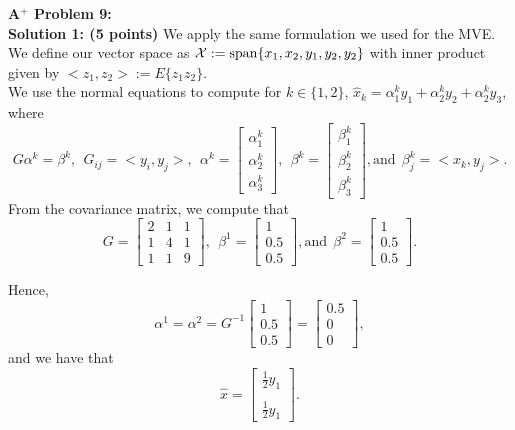 \documentclass[letterpaper]{article}
\begin{document}
\newpage
\noindent \textbf{A$^+$ Problem 9:} \\



 \noindent \textbf{Solution 1: (5 points)} We apply the same formulation we used for the MVE. We define our vector space as ${\cal X} := \textrm{span} \{ x_1, x_2, y_1, y_2, y_2 \}$ with inner product given by $<z_1, z_2>:=E\{ z_1 z_2 \}$. \\

 We use the normal equations to compute for $k \in \{1,2\}$, $\widehat{x}_k = \alpha_1^k y_1+ \alpha_2^k y_2 + \alpha_2^k y_3$, where
 $$ G \alpha^k = \beta^k,~~G_{ij}=<y_i,y_j>,~~\alpha^k =\begin{bmatrix} \alpha_1^k \\ \alpha_2^k \\ \alpha_3^k\end{bmatrix},~~\beta^k =\begin{bmatrix} \beta_1^k \\ \beta_2^k \\ \beta_3^k \end{bmatrix},\text{and}~~\beta^k_j=<x_k,y_j>. $$
From the covariance matrix, we compute that
$$G=\left[  \begin{array}{ccc} 2 & 1 & 1 \\ 1 & 4 & 1 \\1 & 1 &9\end{array} \right],~~\beta^1=\begin{bmatrix} 1 \\ 0.5 \\ 0.5 \end{bmatrix}, \text{and}~~ \beta^2=\begin{bmatrix} 1 \\ 0.5 \\ 0.5 \end{bmatrix}.$$

Hence, $$\alpha^1=\alpha^2= G^{-1} \begin{bmatrix} 1 \\ 0.5 \\ 0.5 \end{bmatrix} = \begin{bmatrix} 0.5 \\ 0\\ 0 \end{bmatrix},$$
and we have that
$$\widehat{x} =  \begin{bmatrix} \frac{1}{2}y_1 \\  \\\frac{1}{2}y_1 \end{bmatrix}. $$
\end{document}
